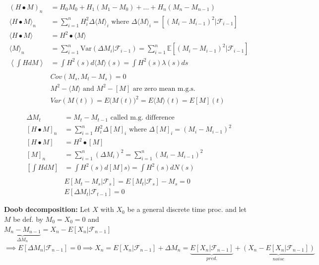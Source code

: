 \documentclass{article}
\begin{document}
\begin{minipage}{0.5\textwidth}
	\begin{align*}
		(H\bullet M)_n &= H_0M_0 + H_1(M_1-M_0) + \hdots + H_n(M_n-M_{n-1}) \\
		\langle H\bullet M \rangle_n &= \sum_{i=1}^n H_i^2\Delta\langle M\rangle_i \text{ where }\Delta \langle M\rangle_i = [(M_i - M_{i-1})^2|\mathcal{F}_{i-1}]\\
		\langle H\bullet M\rangle &= H^2\bullet \langle M\rangle \\
		\langle M \rangle_n &= \sum_{i=1}^n \text{Var}(\Delta M_i| \mathcal{F}_{i-1}) = \sum_{i=1}^n \mathbb{E}[(M_i - M_{i-1})^2|\mathcal{F}_{i-1}] \\
		\left\langle \int HdM\right\rangle &= \int H^2(s)d\langle M\rangle(s) = \int H^2(s) \lambda(s)ds \\
		\\
		&Cov(M_s, M_t-M_s) = 0 \\
		&M^2 - \langle M \rangle \text{ and } M^2 - [M] \text{ are zero mean m.g.s. }\\
		&Var (M(t)) = E\Big( M(t) \Big)^2 = E \langle M \rangle (t) = E[M](t)
	\end{align*}
\end{minipage}
\begin{minipage}{0.5\textwidth}
	\begin{align*}
		\Delta M_t &= M_t - M_{t-1} \text{ called m.g. difference}\\
		[H\bullet M]_n &= \sum_{i=1}^n H_i^2\Delta[M]_i \text{ where }\Delta [M]_i = (M_i - M_{i-1})^2\\
		[H\bullet M] &= H^2\bullet[M] \\
		[M]_n &= \sum_{i=1}^n (\Delta M_i)^2 = \sum_{i=1}^n (M_i -M_{i-1})^2 \\
		\left[ \int HdM\right] &= \int H^2(s)d[ M]s) = \int H^2(s) dN(s) \\
		\\
		&E[M_t-M_s | \mathcal{F}_s] = E[M_t|\mathcal{F}_s] - M_s = 0 \\
		&E[\Delta M_t | \mathcal{F}_{t-1}] = 0
	\end{align*}
\end{minipage}

\medskip

\textbf{Doob decomposition:}
Let $X$ with $X_0$ be a general discrete time proc. and let $M$ be def. by $M_0 = X_0=0$ and \\  $\underbrace{M_n-M_{n-1}}_{\Delta M_n} = X_n-E[X_n|\mathcal{F}_{n-1}]$
$\implies E[\Delta M_n | \mathcal{F}_{n-1}] = 0 \implies X_n = E[X_n | \mathcal{F}_{n-1}] + \Delta M_n = \underbrace{E[X_n | \mathcal{F}_{n-1}]}_{pred.} + \underbrace{(X_n-E[X_n| \mathcal{F}_{n-1}])}_{noise}$
\end{document}

